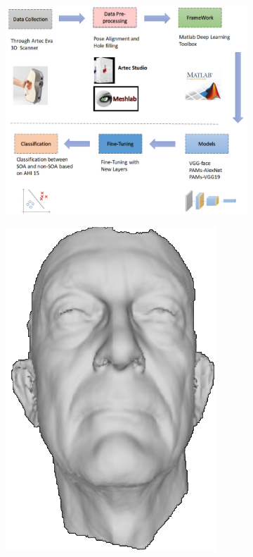 \begin{figure}[h]
	\centering
	\begin{subfigure}[b]{0.62\textwidth}
		\centering
		\includegraphics[width=\textwidth]{figures/resers_e.png}
		\caption{}
		\label{fig:resers:e}
	\end{subfigure}
	\hfill
	\begin{subfigure}[b]{0.37\textwidth}
		\centering
		\includegraphics[width=\textwidth]{figures/resers_f.png}

\end{subfigure}
\end{figure}
